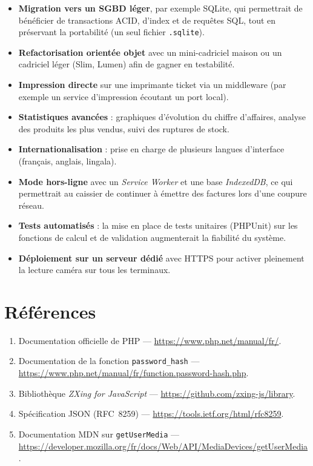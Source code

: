 \documentclass[12pt,a4paper]{article}
\begin{document}
\begin{itemize}[leftmargin=1.5em]
    \item \textbf{Migration vers un SGBD léger}, par exemple SQLite, qui permettrait de bénéficier de transactions ACID, d'index et de requêtes SQL, tout en préservant la portabilité (un seul fichier \texttt{.sqlite}).
    \item \textbf{Refactorisation orientée objet} avec un mini-cadriciel maison ou un cadriciel léger (Slim, Lumen) afin de gagner en testabilité.
    \item \textbf{Impression directe} sur une imprimante ticket via un middleware (par exemple un service d'impression écoutant un port local).
    \item \textbf{Statistiques avancées} : graphiques d'évolution du chiffre d'affaires, analyse des produits les plus vendus, suivi des ruptures de stock.
    \item \textbf{Internationalisation} : prise en charge de plusieurs langues d'interface (français, anglais, lingala).
    \item \textbf{Mode hors-ligne} avec un \textit{Service Worker} et une base \textit{IndexedDB}, ce qui permettrait au caissier de continuer à émettre des factures lors d'une coupure réseau.
    \item \textbf{Tests automatisés} : la mise en place de tests unitaires (PHPUnit) sur les fonctions de calcul et de validation augmenterait la fiabilité du système.
    \item \textbf{Déploiement sur un serveur dédié} avec HTTPS pour activer pleinement la lecture caméra sur tous les terminaux.
\end{itemize}

\section*{Références}

\begin{enumerate}[leftmargin=1.5em]
    \item Documentation officielle de PHP --- \url{https://www.php.net/manual/fr/}.
    \item Documentation de la fonction \texttt{password\_hash} --- \url{https://www.php.net/manual/fr/function.password-hash.php}.
    \item Bibliothèque \textit{ZXing for JavaScript} --- \url{https://github.com/zxing-js/library}.
    \item Spécification JSON (RFC~8259) --- \url{https://tools.ietf.org/html/rfc8259}.
    \item Documentation MDN sur \texttt{getUserMedia} --- \url{https://developer.mozilla.org/fr/docs/Web/API/MediaDevices/getUserMedia}.
\end{enumerate}
\end{document}
